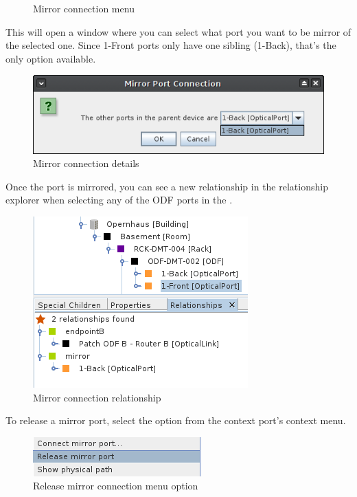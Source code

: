 \documentclass[a4paper]{article}
\begin{document}
\begin{enumerate}
\begin{figure}[h!]
						\caption{Mirror connection menu}
						\label{fig:l1_example_2_mirror_connection_menu}
					\end{figure}
					\newpage
					This will open a window where you can select what port you want to be mirror of the selected one. Since 1-Front ports only have one sibling (1-Back), that's the only option available.
					\begin{figure}[h!]
						\centering
						\includegraphics[width=0.5\linewidth]{img/l1_example_2_mirror_connection_details.png}
						\caption{Mirror connection details}
						\label{fig:l1_example_2_mirror_connection_details}
					\end{figure}
					
					Once the port is mirrored, you can see a new relationship in the relationship explorer when selecting any of the ODF ports in the \textbf{}.
					\begin{figure}[h!]
						\centering
						\includegraphics[width=0.4\linewidth]{img/l1_example_2_mirror_connection_relationships.png}
						\caption{Mirror connection relationship}
						\label{fig:l1_example_2_mirror_connection_relationships}
					\end{figure}
					
					To release a mirror port, select the option from the context port's context menu.
					\begin{figure}[h!]
						\centering
						\includegraphics[width=0.3\linewidth]{img/l1_example_2_mirror_connection_release.png}
						\caption{Release mirror connection menu option}
						\label{fig:l1_example_2_mirror_connection_release}
					\end{figure}
			\end{enumerate}
			
\end{document}

